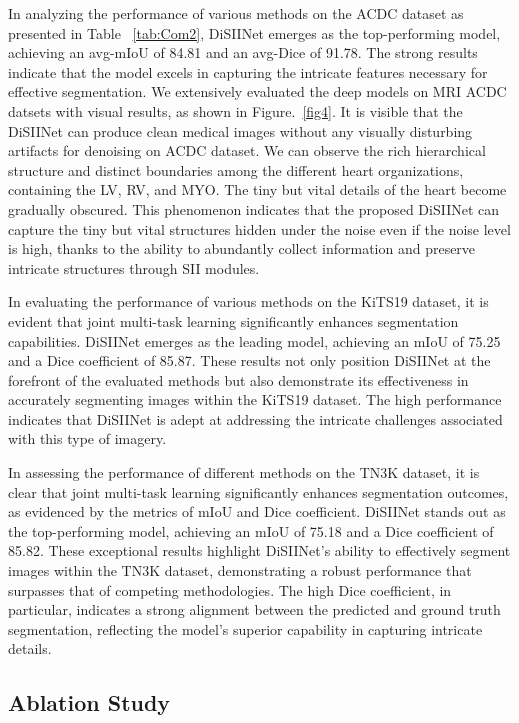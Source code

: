 \documentclass{article}
\begin{document}
In analyzing the performance of various methods on the ACDC dataset as presented in Table ~\ref{tab:Com2}, DiSIINet emerges as the top-performing model, achieving an avg-mIoU of 84.81 and an avg-Dice of 91.78. The strong results indicate that the model excels in capturing the intricate features necessary for effective segmentation. We extensively evaluated the deep models on MRI ACDC datsets with visual results, as shown in Figure.~\ref{fig4}. It is visible that the DiSIINet can produce clean medical images without any visually disturbing artifacts for denoising on ACDC dataset. We can observe the rich hierarchical structure and distinct boundaries among the different heart organizations, containing the LV, RV, and MYO. The tiny but vital details of the heart become gradually obscured. This phenomenon indicates that the proposed DiSIINet can capture the tiny but vital structures hidden under the noise even if the noise level is high, thanks to the ability to abundantly collect information and preserve intricate structures through SII modules.

In evaluating the performance of various methods on the KiTS19 dataset, it is evident that joint multi-task learning significantly enhances segmentation capabilities. DiSIINet emerges as the leading model, achieving an mIoU of 75.25 and a Dice coefficient of 85.87. These results not only position DiSIINet at the forefront of the evaluated methods but also demonstrate its effectiveness in accurately segmenting images within the KiTS19 dataset. The high performance indicates that DiSIINet is adept at addressing the intricate challenges associated with this type of imagery. 

In assessing the performance of different methods on the TN3K dataset, it is clear that joint multi-task learning significantly enhances segmentation outcomes, as evidenced by the metrics of mIoU and Dice coefficient. DiSIINet stands out as the top-performing model, achieving an mIoU of 75.18 and a Dice coefficient of 85.82. These exceptional results highlight DiSIINet's ability to effectively segment images within the TN3K dataset, demonstrating a robust performance that surpasses that of competing methodologies. The high Dice coefficient, in particular, indicates a strong alignment between the predicted and ground truth segmentation, reflecting the model's superior capability in capturing intricate details. 

\subsection{Ablation Study}
\end{document}
